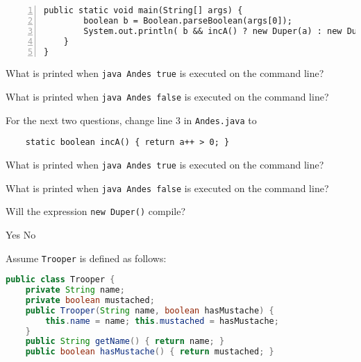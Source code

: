 \documentclass[addpoints,9pt]{exam}
\begin{document}
\begin{questions}
\begin{lstlisting}[numbers=left]
    public static void main(String[] args) {
        boolean b = Boolean.parseBoolean(args[0]);
        System.out.println( b && incA() ? new Duper(a) : new Duper(a + 1));
    }
}
\end{lstlisting}

\question[3] What is printed when {\tt java Andes true} is executed on the command line?

\begin{choices}
\end{choices}

\question[3] What is printed when {\tt java Andes false} is executed on the command line?

\begin{choices}
\end{choices}


\vspace{.1in}
\hspace{-.5in}For the next two questions, change line 3 in {\tt Andes.java} to
\begin{lstlisting}
    static boolean incA() { return a++ > 0; }
\end{lstlisting}
\vspace{.1in}

\question[3] What is printed when {\tt java Andes true} is executed on the command line?

\begin{choices}
\end{choices}

\question[3] What is printed when {\tt java Andes false} is executed on the command line?

\begin{choices}
\end{choices}

\question[3] Will the expression {\tt new Duper()} compile?

\begin{choices}
\choice Yes
\correctchoice No
\end{choices}

\newpage

Assume {\tt Trooper} is defined as follows:
\begin{lstlisting}[language=Java]
public class Trooper {
    private String name;
    private boolean mustached;
    public Trooper(String name, boolean hasMustache) {
        this.name = name; this.mustached = hasMustache;
    }
    public String getName() { return name; }
    public boolean hasMustache() { return mustached; }


\end{lstlisting}
\end{questions}
\end{document}
